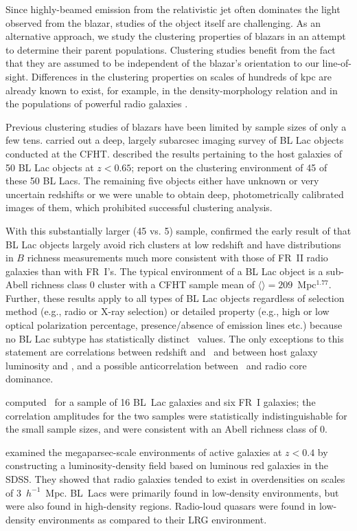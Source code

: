 \documentclass{emulateapj}
\begin{document}
Since highly-beamed emission from the relativistic jet often dominates the light observed from the blazar, studies of the object itself are challenging. As an alternative approach, we study the clustering properties of blazars in an attempt to determine their parent populations. Clustering studies benefit from the fact that they are assumed to be independent of the blazar's orientation to our line-of-sight. Differences in the clustering properties on scales of hundreds of kpc are already known to exist, for example, in the density-morphology relation \citep{dre80} and in the populations of powerful radio galaxies \citep{pre88}. 

Previous clustering studies of blazars have been limited by sample sizes of only a few tens. \citet{wur97} carried out a deep, largely subarcsec imaging survey of BL Lac objects conducted at the CFHT. \citet{wur93} described the results pertaining to the host galaxies of 50 BL Lac objects at $z<0.65$; \citet{wur97} report on the clustering environment of 45 of these 50 BL Lacs. The remaining five objects either have unknown or very uncertain redshifts or we were unable to obtain deep, photometrically calibrated images of them, which prohibited successful clustering analysis.  

With this substantially larger (45 vs. 5) sample, \citet{wur97} confirmed the early result of \citet{pre88} that BL Lac objects largely avoid rich clusters at low redshift and have distributions in $B$ richness measurements much more consistent with those of FR~II radio galaxies than with FR~I's.  The typical environment of a BL Lac object is a sub-Abell richness class 0 cluster with a CFHT sample mean of $\langle$\bgb$\rangle=209$~Mpc$^{1.77}$. Further, these results apply to all types of BL Lac objects regardless of selection method (e.g., radio or X-ray selection) or detailed property (e.g., high or low optical polarization percentage, presence/absence of emission lines etc.) because no BL Lac subtype has statistically distinct \bgb~values. The only exceptions to this statement are correlations between redshift and \bgb~and between host galaxy luminosity and \bgb, and a possible anticorrelation between \bgb~and radio core dominance. 

\citet{smi95} computed \bgb~for a sample of 16 BL~Lac galaxies and six FR~I galaxies; the correlation amplitudes for the two samples were statistically indistinguishable for the small sample sizes, and were consistent with an Abell richness class of 0. 

\citet{lie11} examined the megaparsec-scale environments of active galaxies at $z<0.4$ by constructing a luminosity-density field based on luminous red galaxies in the SDSS. They showed that radio galaxies tended to exist in overdensities on scales of 3~$h^{-1}$~Mpc. BL~Lacs were primarily found in low-density environments, but were also found in high-density regions. Radio-loud quasars were found in low-density environments as compared to their LRG environment. 
\end{document}
